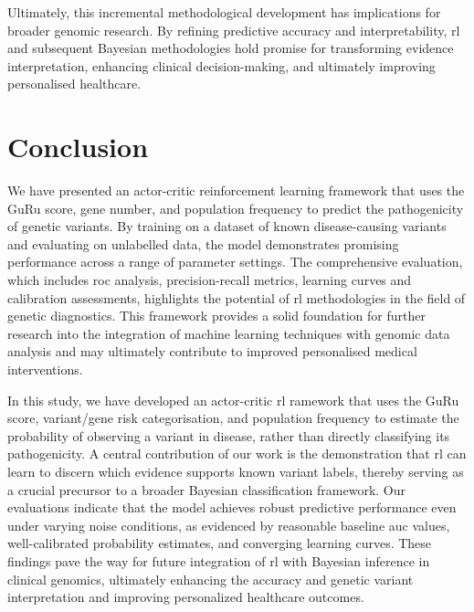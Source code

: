 Ultimately, this incremental methodological development has implications for broader genomic research. By refining predictive accuracy and interpretability, \ac{rl} and subsequent Bayesian methodologies hold promise for transforming evidence interpretation, enhancing clinical decision-making, and ultimately improving personalised healthcare.

\clearpage
\section{Conclusion}
We have presented an actor-critic reinforcement learning framework that uses the GuRu score, gene number, and population frequency to predict the pathogenicity of genetic variants. By training on a dataset of known disease-causing variants and evaluating on unlabelled data, the model demonstrates promising performance across a range of parameter settings. The comprehensive evaluation, which includes \ac{roc} analysis, precision-recall metrics, learning curves and calibration assessments, highlights the potential of \ac{rl} methodologies in the field of genetic diagnostics. This framework provides a solid foundation for further research into the integration of machine learning techniques with genomic data analysis and may ultimately contribute to improved personalised medical interventions.

In this study, we have developed an actor-critic \ac{rl} ramework that uses the GuRu score, variant/gene risk categorisation, and population frequency to estimate the probability of observing a variant in disease, rather than directly classifying its pathogenicity. A central contribution of our work is the demonstration that \ac{rl} can learn to discern which evidence supports known variant labels, thereby serving as a crucial precursor to a broader Bayesian classification framework. Our evaluations indicate that the model achieves robust predictive performance even under varying noise conditions, as evidenced by reasonable baseline \ac{auc} values, well-calibrated probability estimates, and converging learning curves. These findings pave the way for future integration of \ac{rl} with Bayesian inference in clinical genomics, ultimately enhancing the accuracy and genetic variant interpretation and improving personalized healthcare outcomes.


  


